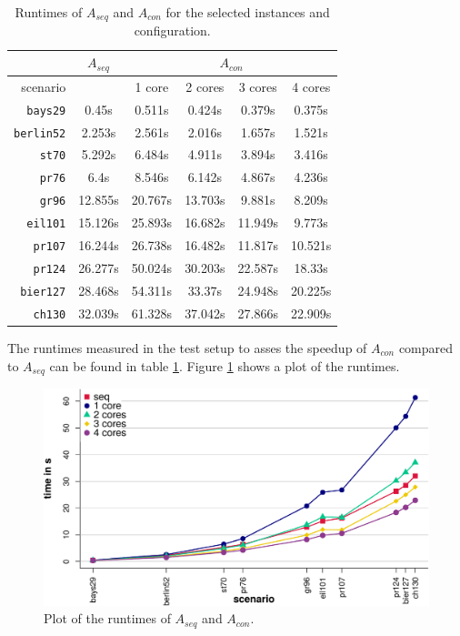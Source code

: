 \begin{table}[h!]
  \centering
  \begin{tabular}{r|c||c|c|c|c|}
    \cline{2-6}
    & \multicolumn{1}{c||}{$A_{seq}$} & \multicolumn{4}{c|}{$A_{con}$} \\
    \hline
    \multicolumn{1}{|r||}{scenario} & & 1 core & 2 cores & 3 cores & 4 cores \\
    \hline
    \hline
    \multicolumn{1}{|r||}{\texttt{bays29}} & 0.45s & 0.511s & 0.424s & 0.379s & 0.375s \\
    \hline
    \multicolumn{1}{|r||}{\texttt{berlin52}} & 2.253s & 2.561s & 2.016s & 1.657s & 1.521s \\
    \hline
    \multicolumn{1}{|r||}{\texttt{st70}} & 5.292s & 6.484s & 4.911s & 3.894s & 3.416s \\
    \hline
    \multicolumn{1}{|r||}{\texttt{pr76}} & 6.4s & 8.546s & 6.142s & 4.867s & 4.236s \\
    \hline
    \multicolumn{1}{|r||}{\texttt{gr96}} & 12.855s & 20.767s & 13.703s & 9.881s & 8.209s \\
    \hline
    \multicolumn{1}{|r||}{\texttt{eil101}} & 15.126s & 25.893s & 16.682s & 11.949s & 9.773s \\
    \hline
    \multicolumn{1}{|r||}{\texttt{pr107}} & 16.244s & 26.738s & 16.482s & 11.817s & 10.521s \\
    \hline
    \multicolumn{1}{|r||}{\texttt{pr124}} & 26.277s & 50.024s & 30.203s & 22.587s & 18.33s \\
    \hline
    \multicolumn{1}{|r||}{\texttt{bier127}} & 28.468s & 54.311s & 33.37s & 24.948s & 20.225s \\
    \hline
    \multicolumn{1}{|r||}{\texttt{ch130}} & 32.039s & 61.328s & 37.042s & 27.866s & 22.909s \\
    \hline
  \end{tabular}
  \caption{Runtimes of $A_{seq}$ and $A_{con}$ for the selected instances and configuration.}
  \label{tbl:test1}
\end{table}
The runtimes measured in the test setup to asses the speedup of $A_{con}$ compared to $A_{seq}$ can be found in table \ref{tbl:test1}. Figure \ref{fig:test_local} shows a plot of the runtimes.

\begin{figure}[h!]
  \centering
  \includegraphics[width=\textwidth]{img/test_local.pdf}
  \caption{Plot of the runtimes of $A_{seq}$ and $A_{con}$.}
  \label{fig:test_local}
\end{figure}

